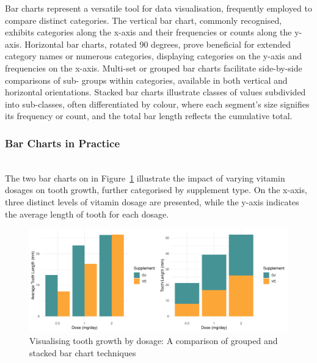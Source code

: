 \documentclass{article}\usepackage[]{graphicx}\usepackage[]{xcolor}
\makeatletter
\def\maxwidth{ %
  \ifdim\Gin@nat@width>\linewidth
    \linewidth
  \else
    \Gin@nat@width
  \fi
}
\newenvironment{knitrout}{}{} %
\numberwithin{equation}{section}
\makeatother
\begin{document}
\noindent Bar charts represent a versatile tool for data visualisation, frequently employed to compare distinct categories. The vertical bar chart, commonly recognised, exhibits categories along the x-axis and their frequencies or counts along the y-axis. Horizontal bar charts, rotated 90 degrees, prove beneficial for extended category names or numerous categories, displaying categories on the y-axis and frequencies on the x-axis. Multi-set or grouped bar charts facilitate side-by-side comparisons of sub- groups within categories, available in both vertical and horizontal orientations. Stacked bar charts illustrate classes of values subdivided into sub-classes, often differentiated by colour, where each segment's size signifies its frequency or count, and the total bar length reflects the cumulative total.

\subsubsection{Bar Charts in Practice}\\
\noident The two bar charts on in Figure~\ref{fig:barcharts} illustrate the impact of varying vitamin dosages on tooth growth, further categorised by supplement type. On the x-axis, three distinct levels of vitamin dosage are presented, while the y-axis indicates the average length of tooth for each dosage.


\begin{knitrout}\scriptsize
{}\color{fgcolor}\begin{figure}[H]

{\centering \includegraphics[width=\maxwidth]{figure/beamer-barcharts-1} 

}

\caption[Visualising tooth growth by dosage]{Visualising tooth growth by dosage: A comparison of grouped and stacked bar chart techniques}\label{fig:barcharts}
\end{figure}

\end{knitrout}
\end{document}
